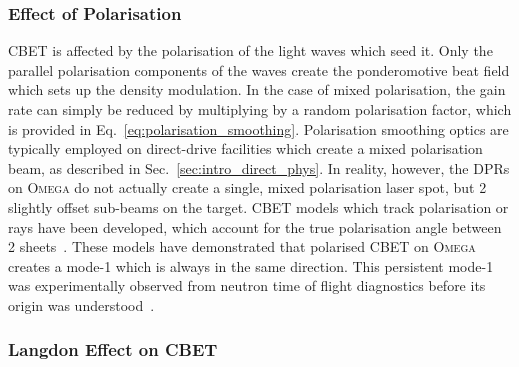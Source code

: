 \subsubsection{Effect of Polarisation}%
\label{sec:theory_cbet_polarisation}

\ac{CBET} is affected by the polarisation of the light waves which seed it.
Only the parallel polarisation components of the waves create the ponderomotive beat field which sets up the density modulation.
In the case of mixed polarisation, the gain rate can simply be reduced by multiplying by a random polarisation factor, which is provided in Eq.~\ref{eq:polarisation_smoothing}.
Polarisation smoothing optics are typically employed on direct-drive facilities which create a mixed polarisation beam, as described in Sec.~\ref{sec:intro_direct_phys}.
In reality, however, the \ac{DPRs} on \textsc{Omega} do not actually create a single, mixed polarisation laser spot, but 2 slightly offset sub-beams on the target.
\ac{CBET} models which track polarisation or rays have been developed, which account for the true polarisation angle between 2 sheets~\cite{edgell_nonuniform_2021,colaitis_3d_2022,colaitis_3d_2023,colaitis_3d_2023a}.
These models have demonstrated that polarised \ac{CBET} on \textsc{Omega} creates a mode-1 which is always in the same direction.
This persistent mode-1 was experimentally observed from neutron time of flight diagnostics before its origin was understood~\cite{mannion_mitigation_2021}.

\subsubsection{Langdon Effect on CBET}%
\label{sec:theory_cbet_langdon}

